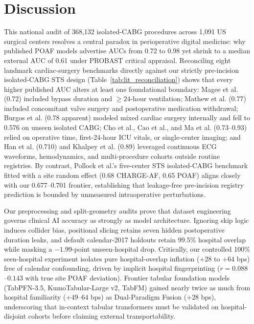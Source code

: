 \section{Discussion}
\label{sec:discussion}

This national audit of 368,132 isolated-CABG procedures across 1,091 US surgical centers resolves a central paradox in perioperative digital medicine: why published POAF models advertise AUCs from 0.72 to 0.98 yet shrink to a median external AUC of 0.61 under PROBAST critical appraisal.\cite{fields2025poaf,lopeztuesta2026poaf} Reconciling eight landmark cardiac-surgery benchmarks directly against our strictly pre-incision isolated-CABG STS design (Table~\ref{tab:lit_reconciliation}) shows that every higher published AUC alters at least one foundational boundary: Magee et al.\cite{magee2007atrial} (0.72) included bypass duration and $\ge 24$-hour ventilation; Mathew et al.\cite{mathew2004multicenter} (0.77) included concomitant valve surgery and postoperative medication withdrawal; Burgos et al.\cite{burgos2021comaf} (0.78 apparent) modeled mixed cardiac surgery internally and fell to 0.576 on unseen isolated CABG; Cho et al.,\cite{cho2026poaf} Cao et al.,\cite{cao2025mimic4} and Ma et al.\cite{ma2025noaf} (0.73--0.93) relied on operative time, first-24-hour ICU vitals, or single-center imaging; and Han et al.\cite{han2025aiecg} (0.710) and Khalpey et al.\cite{khalpey2026digital} (0.89) leveraged continuous ECG waveforms, hemodynamics, and multi-procedure cohorts outside routine registries. By contrast, Pollock et al.'s five-center STS isolated-CABG benchmark fitted with a site random effect (0.68 CHARGE-AF, 0.65 POAF)\cite{pollock2018chargeaf} aligns closely with our 0.677--0.701 frontier, establishing that leakage-free pre-incision registry prediction is bounded by unmeasured intraoperative perturbations.\cite{echahidi2008mechanisms,dobrev2019postoperative}



Our preprocessing and split-geometry audits prove that dataset engineering governs clinical AI accuracy as strongly as model architecture. Ignoring  skip logic induces collider bias,\cite{hernan2020causal} positional slicing retains seven hidden postoperative duration leaks, and default calendar-2017 holdouts retain 99.5\% hospital overlap while masking a $-1.99$-point unseen-hospital drop. Critically, our controlled 100\% seen-hospital experiment isolates pure hospital-overlap inflation ($+28$ to $+64$ bps) free of calendar confounding, driven by implicit hospital fingerprinting ($r=0.088$--$0.143$ with true site POAF deviation). Frontier tabular foundation models (TabPFN-3.5, KumoTabular-Large v2, TabFM) gained nearly twice as much from hospital familiarity ($+49$--$64$ bps) as Dual-Paradigm Fusion ($+28$ bps), underscoring that in-context tabular transformers must be validated on hospital-disjoint cohorts before claiming external transportability.

